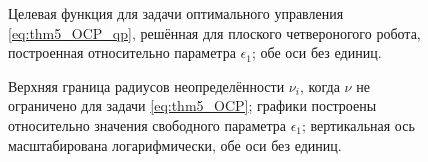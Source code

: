 \begin{figure}[ht]
	\caption{Целевая функция для задачи оптимального управления \eqref{eq:thm5_OCP_qp}, решённая для плоского четвероногого робота, построенная относительно параметра $\epsilon_1$; обе оси без единиц.}\label{fig:mult_soft_qp_cost}
\end{figure}


\begin{figure}[ht]
	\caption{Верхняя граница радиусов неопределённости $\nu_i$, когда $\nu$ не ограничено для задачи \eqref{eq:thm5_OCP}; графики построены относительно значения свободного параметра $\epsilon_1$; вертикальная ось масштабирована логарифмически, обе оси без единиц.}\label{fig:mult_soft_nu_eps_qp}
\end{figure}

